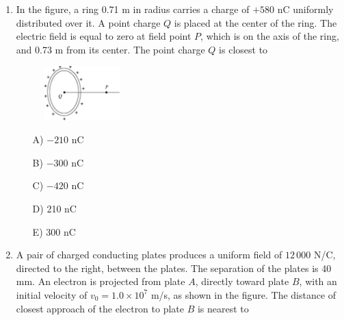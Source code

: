 \begin{enumerate}
    \begin{multicols}{4}
    \begin{itemize}
        \item[A)] $(-3.6\times10^3\text{ N/C})\hat\imath$
        \item[B)] $(1.8\times10^3\text{ N/C})\hat \jmath$
        \item[C)] $(-1.8\times10^3\text{ N/C})\hat k$
        \item[D)] $(3.6\times10^3\text{ N/C})\hat\imath$
        \item[E)] Zero
    \end{itemize}
    \end{multicols}
    


    \item In the figure, a ring 0.71 m in radius carries a charge of $+580$ nC uniformly distributed over it. A point charge $Q$ is placed at the center of the ring. The electric field is equal to zero at field point $P$, which is on the axis of the ring, and 0.73 m from its center. The point charge $Q$ is closest to

    \begin{figure}[H]
        \centering
        \includegraphics[width=0.28\textwidth]{figures-workshop01/problem-12.png}
    \end{figure}

    \begin{multicols}{5}
    \begin{itemize}
        \item[A)] $-210$ nC
        \item[B)] $-300$ nC
        \item[C)] $-420$ nC
        \item[D)] 210 nC
        \item[E)] 300 nC
    \end{itemize}
    \end{multicols}


    \item A pair of charged conducting plates produces a uniform field of $12\,000$ N/C, directed to the right, between the plates. The separation of the plates is 40 mm. An electron is projected from plate $A$, directly toward plate $B$, with an initial velocity of $v_0=1.0\times10^7$ m/s, as shown in the figure. The distance of closest approach of the electron to plate $B$ is nearest to


\end{enumerate}
